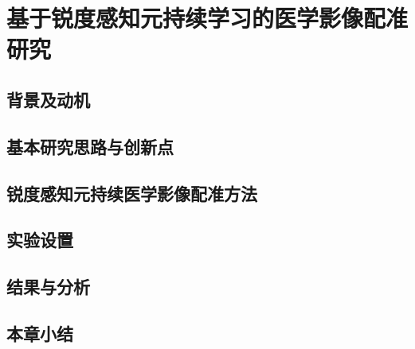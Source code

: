 \chapter{基于锐度感知元持续学习的医学影像配准研究}
\label{chap:samcl}

\section{背景及动机}
\section{基本研究思路与创新点}
\section{锐度感知元持续医学影像配准方法}
\section{实验设置}
\section{结果与分析}
\section{本章小结}
